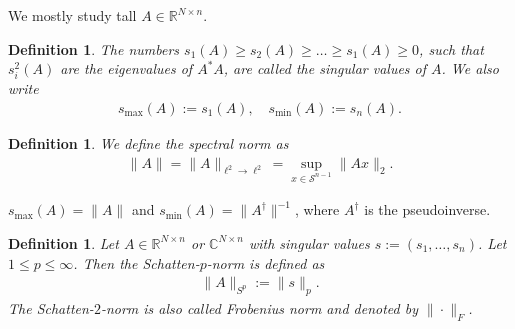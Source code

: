\documentclass[13pt]{article}
\theoremstyle{plain}
\newtheorem{defi}[thm]{Definition}
\newcommand{\R}{\mathbb{R}}
\newcommand{\C}{\mathbb{C}}
\renewcommand{\S}{\mathcal{S}}
\begin{document}
We mostly study tall $A \in \R^{N \times n}$.

\begin{defi}
    The numbers $s_1(A) \ge s_2(A) \ge \ldots \ge s_1(A) \ge 0$, such that
    $s_i^2(A)$ are the eigenvalues of $A^\ast A$, are called the \emph{singular values} of $A$.
    We also write
    \[
        \begin{aligned}
            s_{\max}(A) := s_1(A), \quad s_{\min}(A) := s_n(A) .
        \end{aligned}
    \] 
\end{defi} 

\begin{defi}
    We define the \emph{spectral norm} as
    \[
        \begin{aligned}
            \|A\| = \|A\|_{\ell^2 \to \ell^2} = \sup_{x \in \S^{n-1}} \|Ax\|_2.
        \end{aligned}
    \] 
\end{defi} 

$s_{\max}(A) = \|A\|$ and $s_{\min}(A) = \|A^\dagger\|^{-1}$, where $A^\dagger$ is the pseudoinverse.

\begin{defi}
    Let $A \in \R^{N \times n}$ or $\C^{N \times n}$ with singular values $s := (s_1,\ldots,s_n)$.
    Let $1 \le p \le \infty$. Then the \emph{Schatten-$p$-norm} is defined as
    \[
        \begin{aligned}
            \|A\|_{S^p} := \|s\|_p.
        \end{aligned}
    \]
    The Schatten-$2$-norm is also called \emph{Frobenius norm} and denoted by $\|\cdot\|_F$.
\end{defi}

\newpage

\printbibliography
\end{document}
